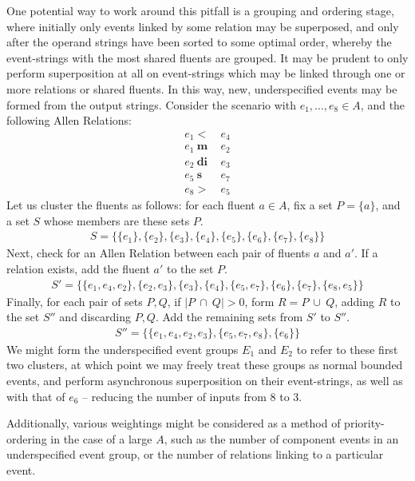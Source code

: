 \documentclass[a4paper,11pt,leqno]{article}
\begin{document}
One potential way to work around this pitfall is a grouping and ordering stage, 
where initially only events linked by some relation may be superposed, and only 
after the operand strings have been sorted to some optimal order, whereby the 
event-strings with the most shared fluents are grouped. It may be 
prudent to only perform superposition at all on event-strings which may be 
linked through one or more relations or shared fluents. In this way, new, 
underspecified events may be formed from the output strings. Consider the 
scenario with $e_1, \ldots, e_8 \in A$, and the following Allen 
Relations:
\begin{subequations}
\begin{align}
e_1 <& ~e_4\\
e_1 ~\mathbf{m}& ~e_2\\
e_2 ~\mathbf{di}& ~e_3\\
e_5 ~\mathbf{s}& ~e_7\\
e_8 >& ~e_5
\end{align}
\end{subequations}
Let us cluster the fluents as follows: for each fluent $a \in A$, fix a set $P 
= \{ a \}$, and a set $S$ whose members are these sets $P$.
\begin{align}
S = \{\{e_1\},\{e_2\},\{e_3\},\{e_4\},\{e_5\},\{e_6\},\{e_7\},\{e_8\}\}
\end{align}
Next, check for an Allen Relation between each pair of fluents $a$ and $a'$. If 
a relation exists, add the fluent $a'$ to the set $P$.
\begin{align}
S' = \{\{e_1, e_4, e_2\},\{e_2, e_3\}, \{e_3\}, \{e_4\}, \{e_5, e_7\}, \{e_6\}, 
\{e_7\}, \{e_8, e_5\}\}
\end{align}
Finally, for each pair of sets $P, Q$, if $|P ~\cap~ Q| > 0$, form $R = P 
~\cup~Q$, adding $R$ to the set $S''$ and discarding $P, Q$. Add the remaining 
sets 
from $S'$ to $S''$.
\begin{align}
S'' = \{\{e_1, e_4, e_2, e_3\}, \{e_5, e_7, e_8\}, \{e_6\}\}
\end{align}
We might form the underspecified event groups $E_1$ and 
$E_2$ to refer to these first two clusters, at which point we may freely treat 
these groups as normal bounded events, and perform asynchronous superposition 
on their event-strings, as well as with that of $e_6$ -- reducing the 
number of inputs from 8 to 3.

Additionally, various weightings might be considered as a method of 
priority-ordering in the case of a large $A$, such as the number of 
component events in an underspecified event group, or the number of relations 
linking to a particular event.
\end{document}
